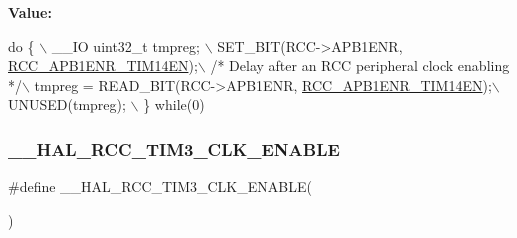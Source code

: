 {\bfseries Value\+:}
\begin{DoxyCode}
\textcolor{keywordflow}{do} \{ \(\backslash\)
                                        \_\_IO uint32\_t tmpreg; \(\backslash\)
                                        SET\_BIT(RCC->APB1ENR, 
      \hyperlink{group___peripheral___registers___bits___definition_gaca040bd66d4a54d4d9e9b261c8102799}{RCC\_APB1ENR\_TIM14EN});\(\backslash\)
                                        \textcolor{comment}{/* Delay after an RCC peripheral clock enabling */}\(\backslash\)
                                        tmpreg = READ\_BIT(RCC->APB1ENR, 
      \hyperlink{group___peripheral___registers___bits___definition_gaca040bd66d4a54d4d9e9b261c8102799}{RCC\_APB1ENR\_TIM14EN});\(\backslash\)
                                        UNUSED(tmpreg); \(\backslash\)
                                      \} \textcolor{keywordflow}{while}(0)
\end{DoxyCode}
\mbox{\label{group___r_c_c___a_p_b1___clock___enable___disable_gaf62d32fdde03df10072d856515692c8d}} 
\subsubsection{\texorpdfstring{\+\_\+\+\_\+\+H\+A\+L\+\_\+\+R\+C\+C\+\_\+\+T\+I\+M3\+\_\+\+C\+L\+K\+\_\+\+E\+N\+A\+B\+LE}{\_\_HAL\_RCC\_TIM3\_CLK\_ENABLE}}
{\footnotesize\ttfamily \#define \+\_\+\+\_\+\+H\+A\+L\+\_\+\+R\+C\+C\+\_\+\+T\+I\+M3\+\_\+\+C\+L\+K\+\_\+\+E\+N\+A\+B\+LE(\begin{DoxyParamCaption}{ }\end{DoxyParamCaption})}

